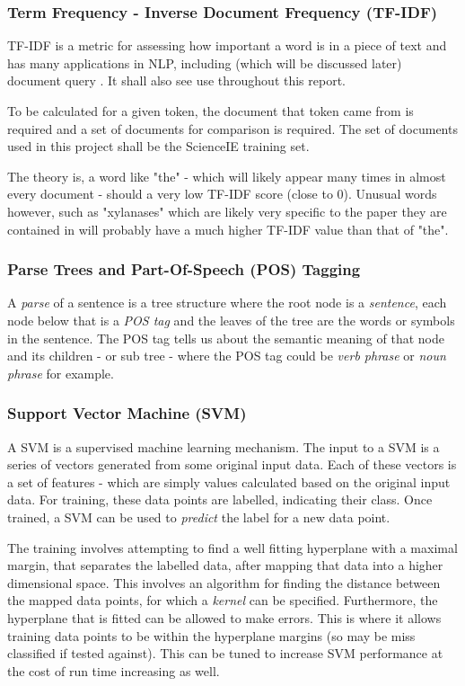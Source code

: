 \subsubsection*{Term Frequency - Inverse Document Frequency (TF-IDF)}
TF-IDF is a metric for assessing how important a word is in a piece of text and has many applications in NLP, including (which will be discussed later) document query \cite{Ramos2003}. It shall also see use throughout this report.

To be calculated for a given token, the document that token came from is required and a set of documents for comparison is required. The set of documents used in this project shall be the ScienceIE training set.

The theory is, a word like "the" - which will likely appear many times in almost every document - should a very low TF-IDF score (close to 0). Unusual words however, such as "xylanases" which are likely very specific to the paper they are contained in will probably have a much higher TF-IDF value than that of "the".

\subsubsection*{Parse Trees and Part-Of-Speech (POS) Tagging}
A \textit{parse} of a sentence is a tree structure where the root node is a \textit{sentence}, each node below that is a \textit{POS tag} and the leaves of the tree are the words or symbols in the sentence. The POS tag tells us about the semantic meaning of that node and its children - or sub tree - where the POS tag could be \textit{verb phrase} or \textit{noun phrase} for example.

\subsubsection*{Support Vector Machine (SVM)}
A SVM is a supervised machine learning mechanism. The input to a SVM is a series of vectors generated from some original input data. Each of these vectors is a set of features - which are simply values calculated based on the original input data. For training, these data points are labelled, indicating their class. Once trained, a SVM can be used to \textit{predict} the label for a new data point.

The training involves attempting to find a well fitting hyperplane with a maximal margin, that separates the labelled data, after mapping that data into a higher dimensional space. This involves an algorithm for finding the distance between the mapped data points, for which a \textit{kernel} can be specified. Furthermore, the hyperplane that is fitted can be allowed to make errors. This is where it allows training data points to be within the hyperplane margins (so may be miss classified if tested against). This can be tuned to increase SVM performance at the cost of run time increasing as well.

